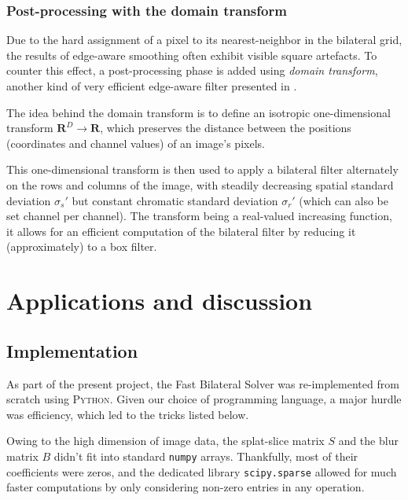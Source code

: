 \documentclass{article}
\begin{document}
\subsubsection{Post-processing with the domain transform}

Due to the hard assignment of a pixel to its nearest-neighbor in the bilateral grid, the results of edge-aware smoothing often exhibit visible square artefacts. To counter this effect, a post-processing phase is added using \textit{domain transform}, another kind of very efficient edge-aware filter presented in \cite{gastal_domain_2011}.

\medskip

The idea behind the domain transform is to define an isotropic one-dimensional transform $\mathbf{R}^D \to \mathbf{R}$, which preserves the distance between the positions (coordinates and channel values) of an image's pixels.

This one-dimensional transform is then used to apply a bilateral filter alternately on the rows and columns of the image, with steadily decreasing spatial standard deviation $\sigma_s'$ but constant chromatic standard deviation $\sigma_r'$ (which can also be set channel per channel). The transform being a real-valued increasing function, it allows for an efficient computation of the bilateral filter by reducing it (approximately) to a box filter.

\section{Applications and discussion}

\subsection{Implementation}

As part of the present project, the Fast Bilateral Solver was re-implemented from scratch using \textsc{Python}. Given our choice of programming language, a major hurdle was efficiency, which led to the tricks listed below.

\medskip

Owing to the high dimension of image data, the splat-slice matrix $S$ and the blur matrix $B$ didn't fit into standard \texttt{numpy} arrays. Thankfully, most of their coefficients were zeros, and the dedicated library \texttt{scipy.sparse} allowed for much faster computations by only considering non-zero entries in any operation.
\end{document}
